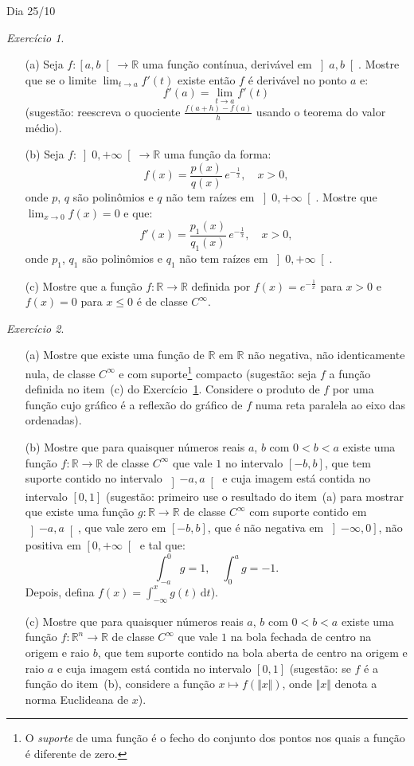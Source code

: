 \documentclass[oneside,11pt]{amsart}
\newcommand{\R}{\mathds R}
\newcommand{\dd}{\mathrm d}
\theoremstyle{remark}\newtheorem{exercise}{Exercício}[section]
\theoremstyle{plain}\newtheorem{teo}{Teorema}[section]
\theoremstyle{plain}\newtheorem{lem}[teo]{Lema}
\theoremstyle{plain}\newtheorem{prop}[teo]{Proposição}
\theoremstyle{definition}\newtheorem{defin}[teo]{Definição}
\theoremstyle{remark}\newtheorem{rem}[teo]{Observação}
\theoremstyle{definition}\newtheorem{example}[teo]{Exemplo}
\numberwithin{equation}{section}
\begin{document}
\begin{section}{Dia 25/10}

\begin{exercise}\label{exe:exp1x}\
\begin{itemize}
\item[(a)] Seja $f:\left[a,b\right[\to\R$ uma função contínua, derivável em $\left]a,b\right[$. Mostre que se o limite $\lim_{t\to a}f'(t)$ existe
então $f$ é derivável no ponto $a$ e:
\[f'(a)=\lim_{t\to a}f'(t)\]
(sugestão: reescreva o quociente $\frac{f(a+h)-f(a)}h$ usando o teorema do valor médio).
\item[(b)] Seja $f:\left]0,+\infty\right[\to\R$ uma função da forma:
\[f(x)=\frac{p(x)}{q(x)}\,e^{-\frac1x},\quad x>0,\]
onde $p$, $q$ são polinômios e $q$ não tem raízes em $\left]0,+\infty\right[$. Mostre que $\lim_{x\to0}f(x)=0$ e que:
\[f'(x)=\frac{p_1(x)}{q_1(x)}\,e^{-\frac1x},\quad x>0,\]
onde $p_1$, $q_1$ são polinômios e $q_1$ não tem raízes em $\left]0,+\infty\right[$.
\item[(c)] Mostre que a função $f:\R\to\R$ definida por $f(x)=e^{-\frac1x}$ para $x>0$ e $f(x)=0$ para $x\le0$ é de classe $C^\infty$.
\end{itemize}
\end{exercise}

\begin{exercise}\label{exe:corteRn}\
\begin{itemize}
\item[(a)] Mostre que existe uma função de $\R$ em $\R$ não negativa, não identicamente nula, de classe $C^\infty$ e com suporte\footnote{%
O {\em suporte\/} de uma função é o fecho do conjunto dos pontos nos quais a função é diferente de zero.} compacto (sugestão:
seja $f$ a função definida no item~(c) do Exercício~\ref{exe:exp1x}. Considere o produto de $f$ por uma função cujo gráfico
é a reflexão do gráfico de $f$ numa reta paralela ao eixo das ordenadas).
\item[(b)] Mostre que para quaisquer números reais $a$, $b$ com $0<b<a$ existe uma função $f:\R\to\R$ de classe $C^\infty$ que vale $1$
no intervalo $[-b,b]$, que tem suporte contido no intervalo $\left]-a,a\right[$ e cuja imagem está contida no intervalo $[0,1]$
(sugestão: primeiro use o resultado do item~(a) para mostrar que existe uma função $g:\R\to\R$ de classe
$C^\infty$ com suporte contido em $\left]-a,a\right[$, que vale zero em $[-b,b]$, que é não negativa em $\left]-\infty,0\right]$,
não positiva em $\left[0,+\infty\right[$ e tal que:
\[\int_{-a}^0g=1,\quad\int_0^ag=-1.\]
Depois, defina $f(x)=\int_{-\infty}^xg(t)\,\dd t$).
\item[(c)] Mostre que para quaisquer números reais $a$, $b$ com $0<b<a$ existe uma função $f:\R^n\to\R$ de classe $C^\infty$ que vale $1$
na bola fechada de centro na origem e raio $b$, que tem suporte contido na bola aberta de centro na origem e raio $a$ e
cuja imagem está contida no intervalo $[0,1]$ (sugestão: se $f$ é a função do item~(b),
considere a função $x\mapsto f(\Vert x\Vert)$, onde $\Vert x\Vert$ denota a norma Euclideana de $x$).
\end{itemize}
\end{exercise}


\end{section}
\end{document}
